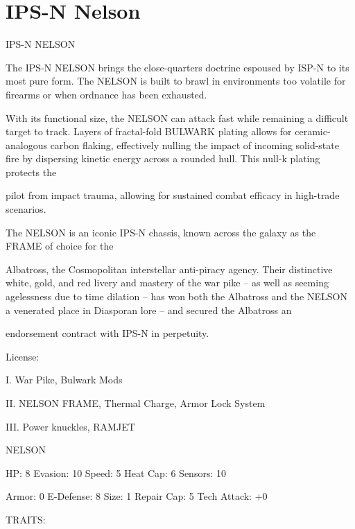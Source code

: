 \section{IPS-N Nelson}

                                              IPS-N NELSON  

The IPS-N NELSON brings the close-quarters doctrine espoused by ISP-N to its most pure form. The  
NELSON is built to brawl in environments too volatile for firearms or when ordnance has been exhausted.  

With its functional size, the NELSON can attack fast while remaining a difficult target to track. Layers of  
fractal-fold BULWARK plating allows for ceramic-analogous carbon flaking, effectively nulling the impact of  
incoming solid-state fire by dispersing kinetic energy across a rounded hull. This null-k plating protects the  

pilot from impact trauma, allowing for sustained combat efficacy in high-trade scenarios.   

The NELSON is an iconic IPS-N chassis, known across the galaxy as the FRAME of choice for the  

Albatross, the Cosmopolitan interstellar anti-piracy agency. Their distinctive white, gold, and red livery and  
mastery of the war pike -- as well as seeming agelessness due to time dilation -- has won both the  
Albatross and the NELSON a venerated place in Diasporan lore -- and secured the Albatross an  

endorsement contract with IPS-N in perpetuity.   

                                                     License:
 
I. War Pike, Bulwark Mods
 
II. NELSON FRAME, Thermal Charge, Armor Lock System
 
III. Power knuckles, RAMJET
 

                                                    NELSON 

  HP: 8           Evasion: 10                            Speed: 5            Heat Cap: 6        Sensors: 10 

  Armor: 0        E-Defense: 8                           Size: 1             Repair Cap: 5      Tech Attack:  
                                                                                                +0 

                                                     TRAITS: 

